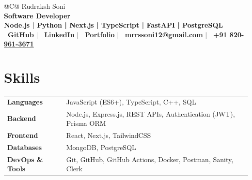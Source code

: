 \documentclass[a4paper,12pt]{article}
\begin{document}
\pagestyle{empty}


\begin{tabularx}{\linewidth}{@{}C@{}}
\Huge{Rudraksh Soni} \\[3pt]

\textbf{Software Developer} \\[3pt]

\textbf{Node.js | Python | Next.js | TypeScript | FastAPI | PostgreSQL} \\[4pt]

\href{https://github.com/rudrakshSoni-dev}{\textbf{\raisebox{-0.05\height}\faGithub\ GitHub}}
$|$
\href{https://www.linkedin.com/in/rudraksh-soni-7674ab2aa/}{\textbf{\raisebox{-0.05\height}\faLinkedin\ LinkedIn}}
$|$
\href{https://dev-portfolio-rudraksh.netlify.app/}{\textbf{\raisebox{-0.05\height}\faGlobe\ Portfolio}}
$|$
\href{mailto://mrrssoni12@gmail.com}{\textbf{\raisebox{-0.05\height}\faEnvelope\ mrrssoni12@gmail.com}}
$|$
\href{tel:+918209613671}{\textbf{\raisebox{-0.05\height}\faMobile\ +91 820-961-3671}}
\end{tabularx}


\section{Skills}

\begin{tabularx}{\linewidth}{@{}l X@{}}

\textbf{Languages} & JavaScript (ES6+), TypeScript, C++, SQL \\

\textbf{Backend} & Node.js, Express.js, REST APIs, Authentication (JWT), Prisma ORM \\

\textbf{Frontend} & React, Next.js, TailwindCSS \\

\textbf{Databases} & MongoDB, PostgreSQL \\

\textbf{DevOps \& Tools} & Git, GitHub, GitHub Actions, Docker, Postman, Sanity, Clerk \\

\end{tabularx}
\end{document}
